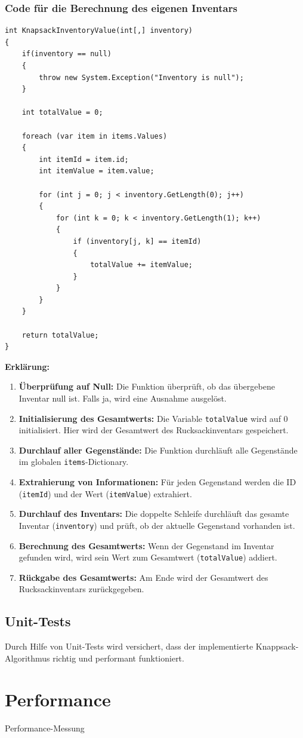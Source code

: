 \subsubsection{Code für die Berechnung des eigenen Inventars}
\begin{lstlisting}[style=csharp, caption={}, label=code:ownInventory]
int KnapsackInventoryValue(int[,] inventory)
{
    if(inventory == null)
    {
        throw new System.Exception("Inventory is null");
    }

    int totalValue = 0;

    foreach (var item in items.Values)
    {
        int itemId = item.id;
        int itemValue = item.value;

        for (int j = 0; j < inventory.GetLength(0); j++)
        {
            for (int k = 0; k < inventory.GetLength(1); k++)
            {
                if (inventory[j, k] == itemId)
                {
                    totalValue += itemValue;
                }
            }
        }
    }

    return totalValue;
}
\end{lstlisting}
\textbf{Erklärung:}
\begin{enumerate}
    \item \textbf{Überprüfung auf Null:} Die Funktion überprüft, ob das übergebene Inventar null ist. Falls ja, wird eine Ausnahme ausgelöst.

    \item \textbf{Initialisierung des Gesamtwerts:} Die Variable \texttt{totalValue} wird auf 0 initialisiert. Hier wird der Gesamtwert des Rucksackinventars gespeichert.

    \item \textbf{Durchlauf aller Gegenstände:} Die Funktion durchläuft alle Gegenstände im globalen \texttt{items}-Dictionary.

    \item \textbf{Extrahierung von Informationen:} Für jeden Gegenstand werden die ID (\texttt{itemId}) und der Wert (\texttt{itemValue}) extrahiert.

    \item \textbf{Durchlauf des Inventars:} Die doppelte Schleife durchläuft das gesamte Inventar (\texttt{inventory}) und prüft, ob der aktuelle Gegenstand vorhanden ist.

    \item \textbf{Berechnung des Gesamtwerts:} Wenn der Gegenstand im Inventar gefunden wird, wird sein Wert zum Gesamtwert (\texttt{totalValue}) addiert.

    \item \textbf{Rückgabe des Gesamtwerts:} Am Ende wird der Gesamtwert des Rucksackinventars zurückgegeben.
\end{enumerate}

\subsection{Unit-Tests}
Durch Hilfe von Unit-Tests wird versichert, dass der implementierte Knappsack-Algorithmus
richtig und performant funktioniert.

\section{Performance}
Performance-Messung
